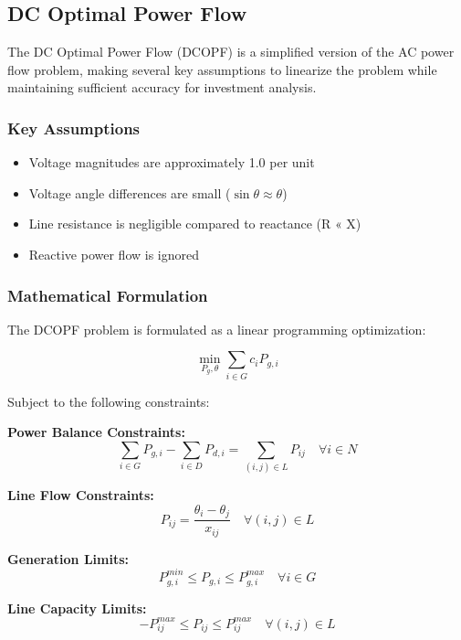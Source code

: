 \subsection{DC Optimal Power Flow}
The DC Optimal Power Flow (DCOPF) is a simplified version of the AC power flow problem, making several key assumptions to linearize the problem while maintaining sufficient accuracy for investment analysis.

\subsubsection{Key Assumptions}
\begin{itemize}
    \item Voltage magnitudes are approximately 1.0 per unit
    \item Voltage angle differences are small ($\sin \theta \approx \theta$)
    \item Line resistance is negligible compared to reactance (R « X)
    \item Reactive power flow is ignored
\end{itemize}

\subsubsection{Mathematical Formulation}
The DCOPF problem is formulated as a linear programming optimization:

\begin{equation}
    \min_{P_g, \theta} \sum_{i \in G} c_i P_{g,i}
\end{equation}

Subject to the following constraints:

\textbf{Power Balance Constraints:}
\begin{equation}
    \sum_{i \in G} P_{g,i} - \sum_{i \in D} P_{d,i} = \sum_{(i,j) \in L} P_{ij} \quad \forall i \in N
\end{equation}

\textbf{Line Flow Constraints:}
\begin{equation}
    P_{ij} = \frac{\theta_i - \theta_j}{x_{ij}} \quad \forall (i,j) \in L
\end{equation}

\textbf{Generation Limits:}
\begin{equation}
    P_{g,i}^{min} \leq P_{g,i} \leq P_{g,i}^{max} \quad \forall i \in G
\end{equation}

\textbf{Line Capacity Limits:}
\begin{equation}
    -P_{ij}^{max} \leq P_{ij} \leq P_{ij}^{max} \quad \forall (i,j) \in L
\end{equation}

